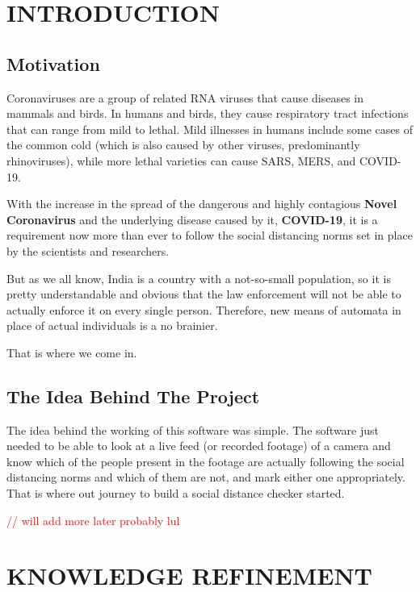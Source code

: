 \documentclass[a4paper]{article}
\begin{document}
\setcounter{page}{1}
\newpage
\setcounter{tocdepth}{2} %
\tableofcontents
\newpage

\setcounter{page}{1}

\section{INTRODUCTION}
\subsection{Motivation}
Coronaviruses are a group of related RNA viruses that cause diseases in mammals
and birds. In humans and birds, they cause respiratory tract infections that can
range from mild to lethal. Mild illnesses in humans include some cases of the
common cold (which is also caused by other viruses, predominantly rhinoviruses),
while more lethal varieties can cause SARS, MERS, and COVID-19.

With the increase in the spread of the dangerous and highly contagious \textbf{Novel Coronavirus}
and the underlying disease caused by it, \textbf{COVID-19},
it is a requirement now more than ever to follow the social distancing
norms set in place by the scientists and researchers.

But as we all know, India is a country with a not-so-small population,
so it is pretty understandable and obvious that the law enforcement will
not be able to actually enforce it on every single person. Therefore,
new means of automata in place of actual individuals is a no brainier.

That is where we come in.

\subsection{The Idea Behind The Project}
The idea behind the working of this software was simple. The software just needed
to be able to look at a live feed (or recorded footage) of a camera and know
which of the people present in the footage are actually following the social
distancing norms and which of them are not, and mark either one appropriately.
That is where out journey to build a social distance checker started.

\textcolor{red}{// will add more later probably lul}
\pagebreak

\section{KNOWLEDGE REFINEMENT}
\end{document}

